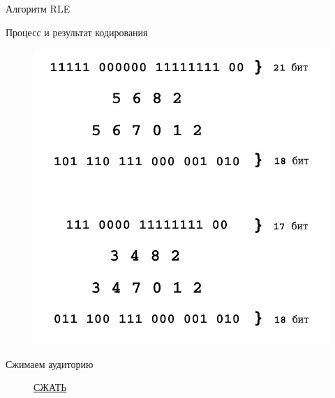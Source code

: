 \documentclass[11pt]{beamer}
\begin{document}
\begin{frame}{Алгоритм RLE}
\begin{block}{Процесс и результат кодирования}
\begin{figure}[H]
	\begin{center}
		\includegraphics[scale=0.25]{../pics/RLE/example.jpg}
	\end{center}
\end{figure}	
\end{block}				
\end{frame} 



\begin{frame}{Сжимаем аудиторию}
\begin{figure}[H]
	\begin{center}
		\huge\href{http://octo.ejiek.com/job/image_compression_algorithms/}{СЖАТЬ}
	\end{center}
\end{figure}					
\end{frame} 
\end{document}
